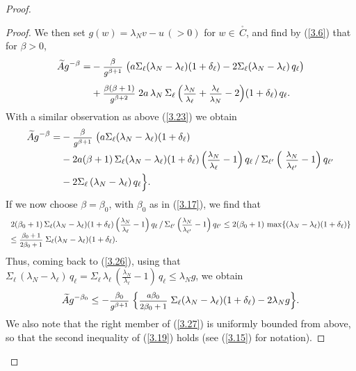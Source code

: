 \documentclass[12pt,leqno]{article}
\def\dis{\displaystyle}
\def\f{\footnotesize}
\def\wt{\widetilde}
\begin{document}
\begin{proof}
\begin{proof}
\medskip
We then set $g(w) = \lambda_N v - u \,(> 0)$ for $w \in \, \stackrel{_\circ}{C}$, and find by (\ref{3.6}) that for $\beta > 0$,
\begin{equation}\label{3.25}
\begin{split}
\wt{A} g^{-\beta} = & - \mbox{\f $\dis\frac{\beta}{g^{\beta + 1}}$} \; \big(a \Sigma_\ell (\lambda_N - \lambda_\ell)(1 + \delta_\ell) - 2 \Sigma_\ell (\lambda_N - \lambda_\ell) \,q_\ell \big)
\\[1ex]
& +  \mbox{\f $\dis\frac{\beta (\beta + 1)}{g^{\beta + 2}}$} \; 2 a \, \lambda_N \, \Sigma_\ell \, \Big(\mbox{\f $\dis\frac{\lambda_N}{\lambda_\ell}$} +  \mbox{\f $\dis\frac{\lambda_\ell}{\lambda_N}$} -2 \Big) (1 + \delta_\ell) \, q_\ell .
\end{split}
\end{equation}
With a similar observation as above (\ref{3.23}) we obtain
\begin{equation}\label{3.26}
\begin{split}
\wt{A} g^{-\beta} = & - \mbox{\f $\dis\frac{\beta}{g^{\beta + 1}}$} \; \big(a \Sigma_\ell (\lambda_N - \lambda_\ell)(1 + \delta_\ell)
\\
& - 2 a (\beta + 1)\, \Sigma_\ell (\lambda_N - \lambda_\ell) (1 + \delta_\ell) \,\Big(\mbox{\f $\dis\frac{\lambda_N}{\lambda_\ell}$} - 1\Big)\,q_\ell  \, / \, \Sigma_{\ell^\prime} \,  \Big(\mbox{ \f $\dis\frac{\lambda_N}{\lambda_{\ell^\prime}}$} - 1\Big)\, q_{\ell^\prime} 
\\
& - 2 \Sigma_\ell \,(\lambda_N - \lambda_\ell) \, q_\ell\Big\}.
\end{split}
\end{equation}
If we now choose $\beta = \beta_0$, with $\beta_0$ as in (\ref{3.17}), we find that 
\begin{equation*}
\begin{array}{l}
2 (\beta_0 + 1) \, \Sigma_\ell (\lambda_N - \lambda_\ell) (1 + \delta_\ell)\, \Big( \mbox{\f $\dis\frac{\lambda_N}{\lambda_\ell}$}  - 1\Big) \, q_\ell \, / \, \Sigma_{\ell^\prime}\,   \Big( \mbox{\f $\dis\frac{\lambda_N}{\lambda_{\ell^\prime}}$}  - 1\Big)\, q_{\ell^\prime} \le 2 (\beta_0 + 1) \, \max \{(\lambda_N - \lambda_\ell) (1 + \delta_\ell)\}
\\
\le \mbox{\f $\dis\frac{\beta_0 + 1}{2 \beta_0 + 1}$} \; \Sigma_\ell (\lambda_N - \lambda_\ell) (1 + \delta_\ell).
\end{array}
\end{equation*}
Thus, coming back to (\ref{3.26}), using that $\Sigma_\ell \,(\lambda_N - \lambda_\ell) \, q_\ell = \Sigma_\ell \, \lambda_\ell \, (\frac{\lambda_N}{\lambda_\ell}  - 1)\, q_\ell \le \lambda_N g$, we obtain
\begin{equation}\label{3.27}
\wt{A} g^{-\beta_0} \le - \mbox{\f $\dis\frac{\beta_0}{g^{\beta + 1}}$} \;\Big\{ \mbox{\f $\dis\frac{a \beta_0}{2\beta _0 + 1}$} \; \Sigma_\ell (\lambda_N - \lambda_\ell) (1 + \delta_\ell) - 2 \lambda_N g\Big\}.
\end{equation}
We also note that the right member of (\ref{3.27}) is uniformly bounded from above, so that the second inequality of (\ref{3.19}) holds (see (\ref{3.15}) for notation).


\end{proof}
\end{proof}
\end{document}
